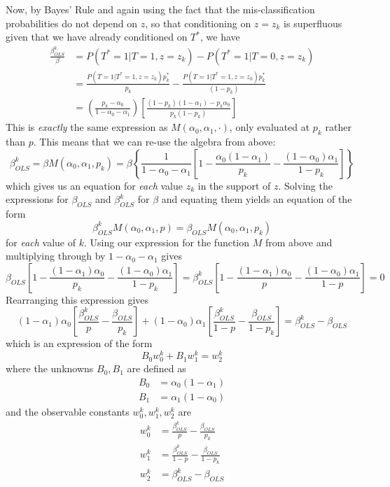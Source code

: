 Now, by Bayes' Rule and again using the fact that the mis-classification probabilities do not depend on $z$, so that conditioning on $z=z_k$ is superfluous given that we have already conditioned on $T^*$, we have
\begin{align*}
  \frac{\beta_{OLS}^k}{\beta} &= P\left( T^*=1|T=1,z=z_k \right) - P(T^*=1|T=0, z=z_k) \\
  &= \frac{P(T=1|T^*=1,z=z_k)p^*_k}{p_k} - \frac{P(T=1|T^*=1,z=z_k)p^*_k}{(1 - p_k)}\\
  &=
  \left( \frac{p_k - \alpha_0}{1 - \alpha_0 - \alpha_1} \right)\left[ \frac{(1-p_k)(1-\alpha_1) - p_k \alpha_0}{p_k(1-p_k)} \right]
\end{align*}
This is \emph{exactly} the same expression as $M(\alpha_0, \alpha_1,\cdot)$, only evaluated at $p_k$ rather than $p$.
This means that we can re-use the algebra from above:
\begin{equation}
  \beta_{OLS}^{k} = \beta M(\alpha_0, \alpha_1, p_k) = \beta\left\{ \frac{1}{1-\alpha_0 - \alpha_1}\left[ 1 - \frac{\alpha_0(1-\alpha_1)}{p_k} - \frac{(1-\alpha_0)\alpha_1}{1 - p_k} \right] \right\}
\end{equation}
which gives us an equation for \emph{each} value $z_k$ in the support of $z$.
Solving the expressions for $\beta_{OLS}$ and $\beta_{OLS}^k$ for $\beta$ and equating them yields an equation of the form
\begin{equation*}
  \beta_{OLS}^k M(\alpha_0, \alpha_1, p) = \beta_{OLS} M(\alpha_0, \alpha_1, p_k)
\end{equation*}
for \emph{each} value of $k$.
Using our expression for the function $M$ from above and multiplying through by $1 - \alpha_0 - \alpha_1$ gives
\[
\beta_{OLS}\left[1-\frac{(1-\alpha_{1})\alpha_{0}}{p_{k}}-\frac{(1-\alpha_{0})\alpha_{1}}{1-p_{k}}\right] = \beta^{k}_{OLS}\left[1-\frac{(1-\alpha_{1})\alpha_{0}}{p}-\frac{(1-\alpha_{0})\alpha_{1}}{1-p}\right]=0
\]
Rearranging this expression gives
\[
(1-\alpha_{1})\alpha_{0}\left[\frac{\beta^{k}_{OLS}}{p}-\frac{\beta_{OLS}}{p_{k}}\right]+(1-\alpha_{0})\alpha_{1}\left[\frac{\beta^{k}_{OLS}}{1-p}-\frac{\beta_{OLS}}{1-p_{k}}\right]=\beta^{k}_{OLS}-\beta_{OLS}
\]
which is an expression of the form
\[
B_{0}w_{0}^{k}+B_{1}w_{1}^{k}=w_{2}^{k}
\]
where the unknowns $B_0, B_1$ are defined as
\begin{align*}
  B_0 &= \alpha_0 (1- \alpha_1)\\
  B_1 &= \alpha_1(1- \alpha_0)
\end{align*}
and the observable constants $w_0^k, w_1^k, w_2^k$ are 
\begin{align*}
  w_0^k &= \frac{\beta_{OLS}^k}{p} - \frac{\beta_{OLS}}{p_k}\\
  w_1^k &= \frac{\beta_{OLS}^k}{1-p} - \frac{\beta_{OLS}}{1-p_k}\\
  w_2^k &= \beta_{OLS}^k - \beta_{OLS}
\end{align*}

